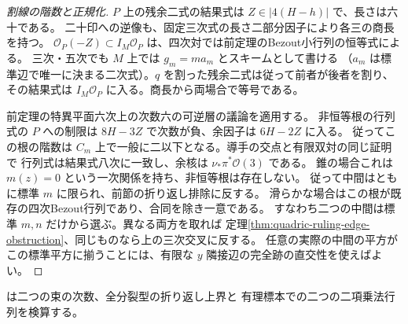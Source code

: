 \begin{proof}[割線の階数と正規化]
$P$ 上の残余二式の結果式は $Z\in|4(H-h)|$ で、長さは六十である。
二十印への逆像も、固定三次式の長さ二部分因子により各三の商長を持つ。
$\mathcal O_P(-Z)\subset I_M\mathcal O_P$ は、四次対では前定理のBezout小行列の恒等式による。
三次・五次でも $M$ 上では $g_m=m a_m$ とスキームとして書ける
（$a_m$ は標準辺で唯一に決まる二次式）。$q$ を割った残余二式は従って前者が後者を割り、
その結果式は $I_M\mathcal O_P$ に入る。商長から両場合で等号である。

前定理の特異平面六次上の次数六の可逆層の議論を適用する。
非恒等根の行列式の $P$ への制限は $8H-3Z$ で次数が負、余因子は $6H-2Z$ に入る。
従ってこの根の階数は $C_m$ 上で一般に二以下となる。導手の交点と有限双対の同じ証明で
行列式は結果式八次に一致し、余核は $\nu_*\pi^*\mathcal O(3)$ である。
錐の場合これは $m(z)=0$ という一次関係を持ち、非恒等根は存在しない。
従って中間はともに標準 $m$ に限られ、前節の折り返し排除に反する。
滑らかな場合はこの根が既存の四次Bezout行列であり、合同を除き一意である。
すなわち二つの中間は標準 $m,n$ だけから選ぶ。異なる両方を取れば
定理\ref{thm:quadric-ruling-edge-obstruction}、同じものなら上の三次交叉に反する。
任意の実際の中間の平方がこの標準平方に揃うことには、有限な $y$ 隣接辺の完全跡の直交性を使えばよい。
\end{proof}
 は二つの束の次数、全分裂型の折り返し上界と
有理標本での二つの二項乗法行列を検算する。
